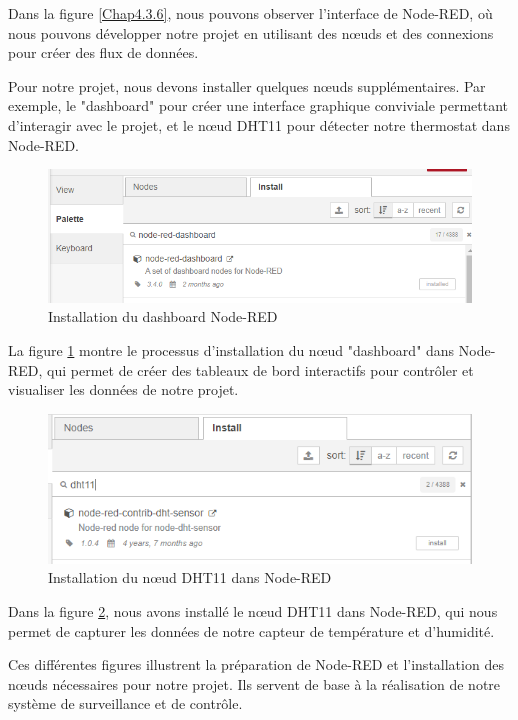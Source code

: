 Dans la figure \ref{Chap4.3.6}, nous pouvons observer l'interface de Node-RED, où nous pouvons développer notre projet en utilisant des nœuds et des connexions pour créer des flux de données.

Pour notre projet, nous devons installer quelques nœuds supplémentaires. Par exemple, le "dashboard" pour créer une interface graphique conviviale permettant d'interagir avec le projet, et le nœud DHT11 pour détecter notre thermostat dans Node-RED.

\begin{figure}[H]
\centering
\includegraphics[width=15cm]{Images/Node-Red-Dashboard-Installed.png}
\caption{Installation du dashboard Node-RED}
\label{Chap4.3.7}
\end{figure}

La figure \ref{Chap4.3.7} montre le processus d'installation du nœud "dashboard" dans Node-RED, qui permet de créer des tableaux de bord interactifs pour contrôler et visualiser les données de notre projet.

\begin{figure}[H]
\centering
\includegraphics[width=15cm]{Images/DHT11-Node-Red-Install.png}
\caption{Installation du nœud DHT11 dans Node-RED}
\label{Chap4.3.8}
\end{figure}

Dans la figure \ref{Chap4.3.8}, nous avons installé le nœud DHT11 dans Node-RED, qui nous permet de capturer les données de notre capteur de température et d'humidité.

Ces différentes figures illustrent la préparation de Node-RED et l'installation des nœuds nécessaires pour notre projet. Ils servent de base à la réalisation de notre système de surveillance et de contrôle.


